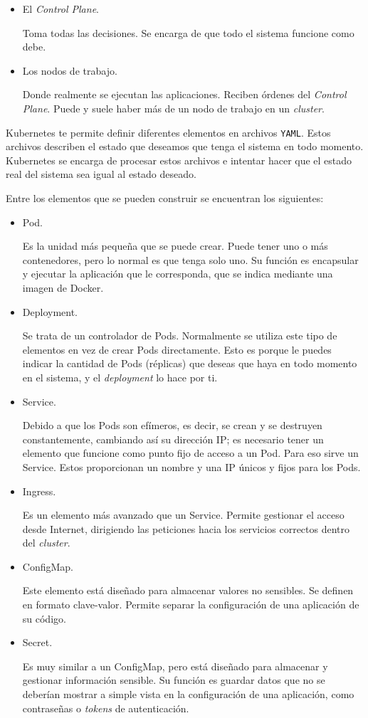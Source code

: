 \begin{itemize}
  \item El \textit{Control Plane}.

    Toma todas las decisiones. Se encarga de que todo el sistema funcione como debe.

  \item Los nodos de trabajo.

    Donde realmente se ejecutan las aplicaciones. Reciben órdenes del \textit{Control Plane}. Puede y suele haber más de un nodo de trabajo en un \textit{cluster}.
\end{itemize}

Kubernetes te permite definir diferentes elementos en archivos \texttt{YAML}. Estos archivos describen el estado que deseamos que tenga el sistema en todo momento. Kubernetes se encarga de procesar estos archivos e intentar hacer que el estado real del sistema sea igual al estado deseado.

Entre los elementos que se pueden construir se encuentran los siguientes:

\begin{itemize}
  \item Pod.

    Es la unidad más pequeña que se puede crear. Puede tener uno o más contenedores, pero lo normal es que tenga solo uno. Su función es encapsular y ejecutar la aplicación que le corresponda, que se indica mediante una imagen de Docker.
  \item Deployment.

    Se trata de un controlador de Pods. Normalmente se utiliza este tipo de elementos en vez de crear Pods directamente. Esto es porque le puedes indicar la cantidad de Pods (réplicas) que deseas que haya en todo momento en el sistema, y el \textit{deployment} lo hace por ti.
  \item Service.

    Debido a que los Pods son efímeros, es decir, se crean y se destruyen constantemente, cambiando así su dirección IP; es necesario tener un elemento que funcione como punto fijo de acceso a un Pod. Para eso sirve un Service. Estos proporcionan un nombre y una IP únicos y fijos para los Pods.
  \item Ingress.

    Es un elemento más avanzado que un Service. Permite gestionar el acceso desde Internet, dirigiendo las peticiones hacia los servicios correctos dentro del \textit{cluster}.

  \item ConfigMap.

    Este elemento está diseñado para almacenar valores no sensibles. Se definen en formato clave-valor. Permite separar la configuración de una aplicación de su código.

  \item Secret.

    Es muy similar a un ConfigMap, pero está diseñado para almacenar y gestionar información sensible. Su función es guardar datos que no se deberían mostrar a simple vista en la configuración de una aplicación, como contraseñas o \textit{tokens} de autenticación.
\end{itemize}

